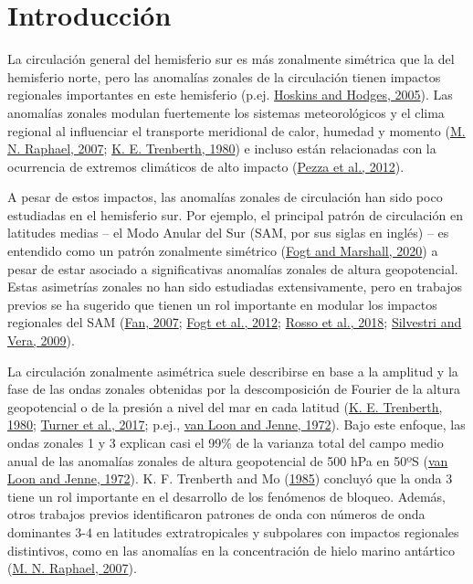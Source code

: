 \documentclass[12pt,oneside,a4paper]{reedthesis}
\begin{document}
\hypertarget{intro}{%
\chapter{Introducción}\label{intro}}

La circulación general del hemisferio sur es más zonalmente simétrica que la del hemisferio norte, pero las anomalías zonales de la circulación tienen impactos regionales importantes en este hemisferio (p.ej. \protect\hyperlink{ref-hoskins2005}{Hoskins and Hodges, 2005}).
Las anomalías zonales modulan fuertemente los sistemas meteorológicos y el clima regional al influenciar el transporte meridional de calor, humedad y momento (\protect\hyperlink{ref-raphael2007}{M. N. Raphael, 2007}; \protect\hyperlink{ref-trenberth1980a}{K. E. Trenberth, 1980}) e incluso están relacionadas con la ocurrencia de extremos climáticos de alto impacto (\protect\hyperlink{ref-pezza2012}{Pezza et al., 2012}).

A pesar de estos impactos, las anomalías zonales de circulación han sido poco estudiadas en el hemisferio sur.
Por ejemplo, el principal patrón de circulación en latitudes medias -- el Modo Anular del Sur (SAM, por sus siglas en inglés) -- es entendido como un patrón zonalmente simétrico (\protect\hyperlink{ref-fogt2020}{Fogt and Marshall, 2020}) a pesar de estar asociado a significativas anomalías zonales de altura geopotencial.
Estas asimetrías zonales no han sido estudiadas extensivamente, pero en trabajos previos se ha sugerido que tienen un rol importante en modular los impactos regionales del SAM (\protect\hyperlink{ref-fan2007}{Fan, 2007}; \protect\hyperlink{ref-fogt2012}{Fogt et al., 2012}; \protect\hyperlink{ref-rosso2018}{Rosso et al., 2018}; \protect\hyperlink{ref-silvestri2009}{Silvestri and Vera, 2009}).

La circulación zonalmente asimétrica suele describirse en base a la amplitud y la fase de las ondas zonales obtenidas por la descomposición de Fourier de la altura geopotencial o de la presión a nivel del mar en cada latitud (\protect\hyperlink{ref-trenberth1980a}{K. E. Trenberth, 1980}; \protect\hyperlink{ref-turner2017}{Turner et al., 2017}; p.ej., \protect\hyperlink{ref-vanloon1972}{van Loon and Jenne, 1972}).
Bajo este enfoque, las ondas zonales 1 y 3 explican casi el 99\% de la varianza total del campo medio anual de las anomalías zonales de altura geopotencial de 500 hPa en 50ºS (\protect\hyperlink{ref-vanloon1972}{van Loon and Jenne, 1972}).
K. F. Trenberth and Mo (\protect\hyperlink{ref-trenberth1985}{1985}) concluyó que la onda 3 tiene un rol importante en el desarrollo de los fenómenos de bloqueo.
Además, otros trabajos previos identificaron patrones de onda con números de onda dominantes 3-4 en latitudes extratropicales y subpolares con impactos regionales distintivos, como en las anomalías en la concentración de hielo marino antártico (\protect\hyperlink{ref-raphael2007}{M. N. Raphael, 2007}).
\end{document}
